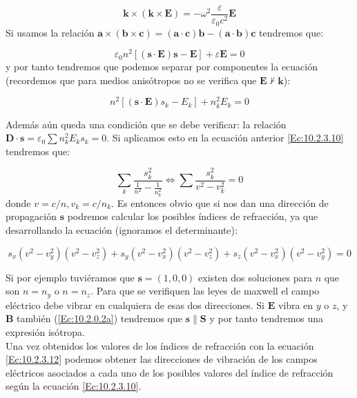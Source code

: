 \documentclass[12pt]{article}
\newcommand{\Bn}{\mathbf{B}}
\newcommand{\En}{\mathbf{E}}
\newcommand{\Dn}{\mathbf{D}}
\newcommand{\kn}{\mathbf{k}}
\newcommand{\an}{\mathbf{a}}
\newcommand{\Sn}{\mathbf{S}}
\newcommand{\sn}{\mathbf{s}}
\newcommand{\bn}{\mathbf{b}}
\newcommand{\cn}{\mathbf{c}}
\numberwithin{equation}{section}
\numberwithin{figure}{section}
\begin{document}
\begin{equation}
\kn \times ( \kn \times \En ) = - \omega^2  \dfrac{\varepsilon}{\varepsilon_0 c^2} \En
\end{equation}
Si usamos la relación $\an \times (\bn \times \cn) = (\an \cdot \cn) \bn - (\an \cdot \bn) \cn$ tendremos que:

\begin{equation}
\varepsilon_0 n^2 [(\sn \cdot \En) \sn - \En] + \varepsilon \En = 0 
\end{equation}
y por tanto tendremos que podemos separar por componentes la ecuación (recordemos que para medios anisótropos no se verifica que $\En \nvdash \kn$):

\begin{equation}
n^2 [ (\sn \cdot \En) s_k - E_k ] + n_k^2 E_k = 0 \label{Ec:10.2.3.10}
\end{equation}

Además aún queda una condición que se debe verificar: la relación $\Dn \cdot \sn  = \varepsilon_0 \sum n_k^2 E_k s_k = 0$. Si aplicamos esto en la ecuación anterior \ref{Ec:10.2.3.10} tendremos que:

\begin{equation}
\sum_k \dfrac{s_k^2}{\frac{1}{n^2}-\frac{1}{n_k^2}} \Longleftrightarrow \sum \dfrac{s_k^2}{v^2 - v_k^2} = 0
\end{equation}
donde $v=c/n,v_k = c/n_k$. Es entonces obvio que si nos dan una dirección de propagación $\sn$ podremos calcular los posibles índices de refracción, ya que desarrollando la ecuación (ignoramos el determinante):

\begin{equation}
s_x (v^2 - v_y^2)(v^2-v_z^2)+s_y (v^2 - v_x^2)(v^2-v_z^2)+s_z (v^2 - v_x^2)(v^2-v_y^2)=0 \label{Ec:10.2.3.12}
\end{equation}

Si por ejemplo tuviéramos que $\sn=(1,0,0)$ existen dos soluciones para $n$ que son $n=n_y$ o $n=n_z$. Para que se verifiquen las leyes de maxwell el campo eléctrico debe vibrar en cualquiera de esas dos direcciones. Si $\En$ vibra en $y$ o $z$, y $\Bn$ también (\ref{Ec:10.2.0.2a}) tendremos que $\sn \parallel \Sn$ y por tanto tendremos una expresión isótropa. \\


Una vez obtenidos los valores de los índices de refracción con la ecuación \ref{Ec:10.2.3.12} podemos obtener las direcciones de vibración de los campos eléctricos asociados a cada uno de los posibles valores del índice de refracción según la ecuación \ref{Ec:10.2.3.10}.
\end{document}
